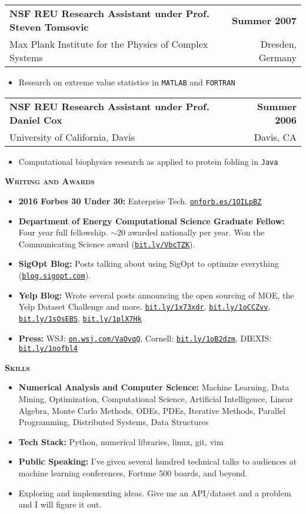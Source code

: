 \documentclass[letterpaper, 11pt]{article}
\makeatletter
\renewcommand{\section}[1]{%
  \begin{tcolorbox}
    \textsc{\textbf{\large{#1}}}
  \end{tcolorbox}
}
\newcommand{\entry}[4]{%
  \begin{tabularx}{\linewidth}{@{}Xr@{}}
    \textbf{#2} & \textbf{#1} \\
    #3          & #4          \\
  \end{tabularx}
}
\newcommand{\website}[1]{\href{http://#1}{\texttt{#1}}}
\makeatother
\begin{document}
  \entry{Summer 2007}{NSF REU Research Assistant under Prof. Steven Tomsovic}{Max Plank Institute for the Physics of Complex Systems}{Dresden, Germany}
  \begin{itemize}
    \item{Research on extreme value statistics in \texttt{MATLAB} and \texttt{FORTRAN}}
  \end{itemize}

  \entry{Summer 2006}{NSF REU Research Assistant under Prof. Daniel Cox}{University of California, Davis}{Davis, CA}
  \begin{itemize}
    \item{Computational biophysics research as applied to protein folding in \texttt{Java}}
  \end{itemize}

  \section{Writing and Awards}

  \begin{itemize}
    \item {\bf 2016 Forbes 30 Under 30:} Enterprise Tech. \website{onforb.es/1OILpBZ}
    \item {\bf Department of Energy Computational Science Graduate Fellow:} Four year full fellowship. $\sim$20 awarded nationally per year. Won the Communicating Science award (\website{bit.ly/VbcTZK}).
    \item {\bf SigOpt Blog:} Posts talking about using SigOpt to optimize everything (\website{blog.sigopt.com}).
    \item {\bf Yelp Blog:} Wrote several posts announcing the open sourcing of MOE, the Yelp Dataset Challenge and more. \website{bit.ly/1x73xdr}, \website{bit.ly/1oCCZvv}, \website{bit.ly/1sOsEBS}, \website{bit.ly/1plX7Hk}
    \item {\bf Press:} WSJ: \website{on.wsj.com/VaOvqQ}, Cornell: \website{bit.ly/1oB2dzm},  DIEXIS: \website{bit.ly/1oofbl4}
  \end{itemize}

  \section{Skills}

  \begin{itemize}
    \item {\bf Numerical Analysis and Computer Science:} Machine Learning, Data Mining, Optimization, Computational Science, Artificial Intelligence, Linear Algebra, Monte Carlo Methods, ODEs, PDEs, Iterative Methods, Parallel Programming, Distributed Systems, Data Structures
    \item {\bf Tech Stack:} Python, numerical libraries, linux, git, vim
    \item {\bf Public Speaking:} I've given several hundred technical talks to audiences at machine learning conferences, Fortune 500 boards, and beyond.
    \item Exploring and implementing ideas. Give me an API/dataset and a problem and I will figure it out.
  \end{itemize}
\end{document}
